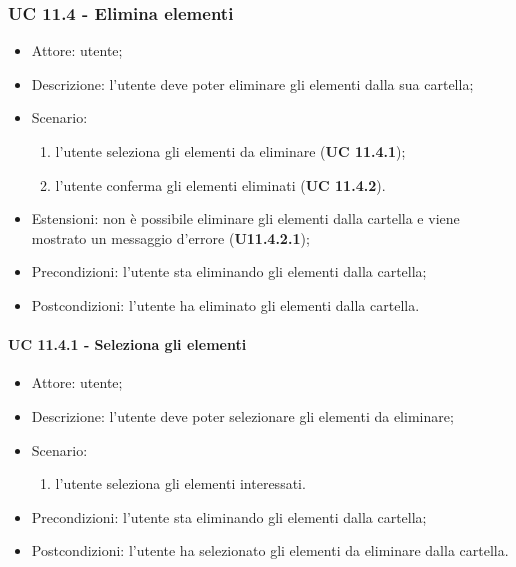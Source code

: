     \subsubsection{UC 11.4 - Elimina elementi}
    \begin{itemize}
        \item Attore: utente;
        \item Descrizione: l'utente deve poter eliminare gli elementi dalla sua cartella;
        \item Scenario:
        \begin{enumerate}
        \item l'utente seleziona gli elementi da eliminare (\textbf{UC 11.4.1});
        \item l'utente conferma gli elementi eliminati (\textbf{UC 11.4.2}).
        \end{enumerate}
        \item Estensioni: non è possibile eliminare gli elementi dalla cartella e viene mostrato un messaggio d'errore (\textbf{U11.4.2.1});
        \item Precondizioni: l'utente sta eliminando gli elementi dalla cartella;
        \item Postcondizioni: l'utente ha eliminato gli elementi dalla cartella.
    \end{itemize}
    \paragraph{UC 11.4.1 - Seleziona gli elementi}
        \begin{itemize}
            \item Attore: utente;
            \item Descrizione: l'utente deve poter selezionare gli elementi da eliminare;
            \item Scenario:
            \begin{enumerate}
                \item l'utente seleziona gli elementi interessati.
            \end{enumerate}
        \item Precondizioni: l'utente sta eliminando gli elementi dalla cartella;
        \item Postcondizioni: l'utente ha selezionato gli elementi da eliminare dalla cartella.
    \end{itemize}
